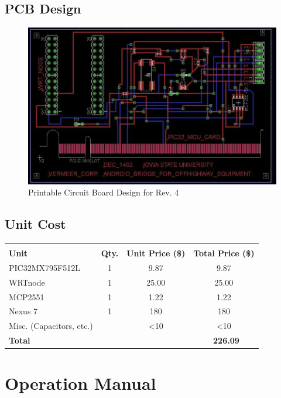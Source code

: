 \documentclass[paper=a4, fontsize=11pt]{scrartcl}
\numberwithin{equation}{section}		%
\numberwithin{figure}{section}			%
\numberwithin{table}{section}				%
\begin{document}
\subsection{PCB Design}
 \begin{figure}[ht]
	 \center\includegraphics[scale=0.4]{PCB.jpg}
 \caption{Printable Circuit Board Design for Rev. 4}
 \end{figure}

 \subsection{Unit Cost}
 \vspace{10pt}
 \begin{center}
 \begin{tabular}{l c c c}
	\hline\\
	 \textbf{Unit} & \textbf{Qty.} & \textbf{Unit Price (\$)} & \textbf{Total Price (\$)} \\ [1ex]
	 PIC32MX795F512L & 1 & 9.87 & 9.87 \\ [1ex]
	 WRTnode & 1 & 25.00 & 25.00 \\ [1ex]
	 MCP2551 & 1 & 1.22 & 1.22 \\ [1ex]
	 Nexus 7 & 1 & 180 & 180 \\ [1ex]
	 Misc. (Capacitors, etc.) & & <10 & <10 \\ [1ex] \cline{4-4}
	 \textbf{Total}&&& \textbf{~226.09} \\ [1ex]
	\hline
\end{tabular}
\end{center}
 

 \pagebreak
 \section{Operation Manual}
\end{document}
